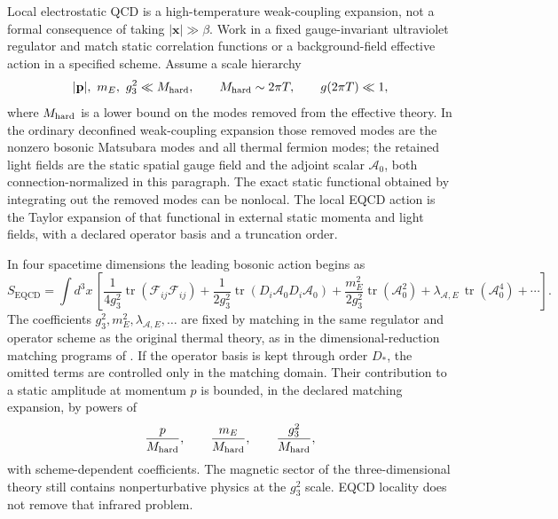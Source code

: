 \begin{controlledapproximation}
\label{ca:thermal-eqcd-local-matching}
Local electrostatic QCD is a high-temperature weak-coupling expansion, not a
formal consequence of taking \(|\mathbf x|\gg\beta\).  Work in a fixed
gauge-invariant ultraviolet regulator and match static correlation functions
or a background-field effective action in a specified scheme.  Assume a
scale hierarchy
\begin{equation}
  |\mathbf p|,\ m_E,\ g_3^2 \ll M_{\rm hard},
  \qquad
  M_{\rm hard}\sim 2\pi T,
  \qquad
  g(2\pi T)\ll1,
  \label{eq:thermal-eqcd-scale-hierarchy}
\end{equation}
where \(M_{\rm hard}\) is a lower bound on the modes removed from the
effective theory.  In the ordinary deconfined weak-coupling expansion those
removed modes are the nonzero bosonic Matsubara modes and all thermal
fermion modes; the retained light fields are the static spatial gauge field
and the adjoint scalar \(\mathcal A_0\), both connection-normalized in this
paragraph.  The exact static functional obtained by integrating out the
removed modes can be nonlocal.  The local EQCD action is the Taylor expansion
of that functional in external static momenta and light fields, with a
declared operator basis and a truncation order.

In four spacetime dimensions the leading bosonic action begins as
\[
  S_{\mathrm{EQCD}}
  =
  \int d^3x\,
  \left[
  \frac{1}{4g_3^2}\operatorname{tr}(\mathcal F_{ij}\mathcal F_{ij})
  +\frac{1}{2g_3^2}\operatorname{tr}(D_i\mathcal A_0D_i\mathcal A_0)
  +\frac{m_E^2}{2g_3^2}\operatorname{tr}(\mathcal A_0^2)
  +\lambda_{\mathcal A,E}\,\operatorname{tr}(\mathcal A_0^4)+\cdots
  \right].
\]
The coefficients \(g_3^2,m_E^2,\lambda_{\mathcal A,E},\ldots\) are fixed by
matching in the same regulator and operator scheme as the original thermal
theory, as in the dimensional-reduction matching programs of
\cite{BraatenNieto1995EFTThermo,KajantieEtAl1996DimensionalReduction}.  If the
operator basis is kept through order \(D_\ast\), the omitted terms are
controlled only in the matching domain.  Their contribution to a static
amplitude at momentum \(p\) is bounded, in the declared matching expansion, by
powers of
\begin{equation}
  \frac{p}{M_{\rm hard}},\qquad
  \frac{m_E}{M_{\rm hard}},\qquad
  \frac{g_3^2}{M_{\rm hard}},
  \label{eq:thermal-eqcd-expansion-parameters}
\end{equation}
with scheme-dependent coefficients.  The magnetic sector of the
three-dimensional theory still contains nonperturbative physics at the
\(g_3^2\) scale.  EQCD locality does not remove that infrared problem.


\end{controlledapproximation}
